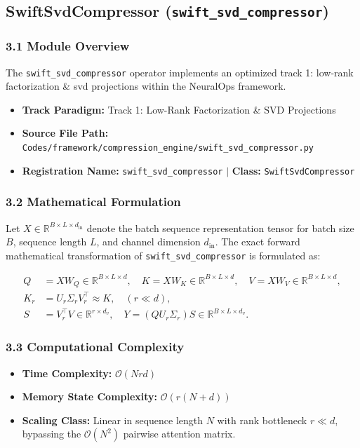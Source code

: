 \subsection{SwiftSvdCompressor (\texttt{swift\_svd\_compressor})}
\label{sec:app_module_swift\_svd\_compressor}

\subsubsection*{3.1 Module Overview}
The \texttt{swift\_svd\_compressor} operator implements an optimized track 1: low-rank factorization \& svd projections within the NeuralOps framework.
\begin{itemize}
    \item \textbf{Track Paradigm:} Track 1: Low-Rank Factorization & SVD Projections
    \item \textbf{Source File Path:} \texttt{Codes/framework/compression\_engine/swift\_svd\_compressor.py}
    \item \textbf{Registration Name:} \texttt{swift\_svd\_compressor} $\mid$ \textbf{Class:} \texttt{SwiftSvdCompressor}
\end{itemize}

\subsubsection*{3.2 Mathematical Formulation}
Let $X \in \mathbb{R}^{B \times L \times d_{\text{in}}}$ denote the batch sequence representation tensor for batch size $B$, sequence length $L$, and channel dimension $d_{\text{in}}$. The exact forward mathematical transformation of \texttt{swift\_svd\_compressor} is formulated as:

\begin{align}
Q &= X W_Q \in \mathbb{R}^{B \times L \times d}, \quad K = X W_K \in \mathbb{R}^{B \times L \times d}, \quad V = X W_V \in \mathbb{R}^{B \times L \times d}, \\
K_r &= U_r \Sigma_r V_r^\top \approx K, \quad (r \ll d), \\
S &= V_r^\top V \in \mathbb{R}^{r \times d_v}, \quad Y = (Q U_r \Sigma_r) S \in \mathbb{R}^{B \times L \times d_v}.
\end{align}


\subsubsection*{3.3 Computational Complexity}
\begin{itemize}
    \item \textbf{Time Complexity:} $\mathcal{O}(N r d)$
    \item \textbf{Memory State Complexity:} $\mathcal{O}(r(N + d))$
    \item \textbf{Scaling Class:} Linear in sequence length $N$ with rank bottleneck $r \ll d$, bypassing the $\mathcal{O}(N^2)$ pairwise attention matrix.
\end{itemize}

